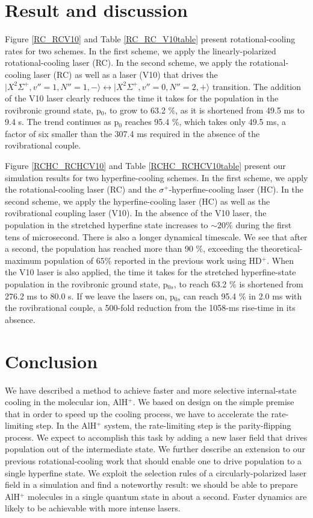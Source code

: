 \documentclass[nofootinbib,aip,jcp,reprint]{revtex4-1}
\begin{document}
\section{Result and discussion}
Figure \ref{RC_RCV10} and Table \ref{RC_RC_V10table} present rotational-cooling rates for two schemes. In the first scheme, we apply the linearly-polarized rotational-cooling laser (RC). In the second scheme, we apply the rotational-cooling laser (RC) as well as a laser (V10) that drives the $\lvert X^2\Sigma^+, v''=1, N''=1, -\rangle \leftrightarrow \lvert X^2\Sigma^+, v''=0, N''=2, +\rangle$ transition. The addition of the V10 laser clearly reduces the time it takes for the population in the rovibronic ground state, p$_0$, to grow to 63.2 $\%$, as it is shortened from 49.5 ms to 9.4 {\micro}s. The trend continues as p$_0$ reaches 95.4 $\%$, which takes only 49.5 ms, a factor of six smaller than the 307.4 ms required in the absence of the rovibrational couple.

Figure \ref{RCHC_RCHCV10} and Table \ref{RCHC_RCHCV10table} present our simulation results for two hyperfine-cooling schemes. In the first scheme, we apply the rotational-cooling laser (RC) and the $\sigma^+$-hyperfine-cooling laser (HC). In the second scheme, we apply the hyperfine-cooling laser (HC) as well as the rovibrational coupling laser (V10). In the absence of the V10 laser, the population in the stretched hyperfine state increases to $\sim 20 \%$ during the first tens of microsecond. There is also a longer dynamical timescale. We see that after a second, the population has reached more than 90 $\%$, exceeding the theoretical-maximum population of $65 \%$ reported in the previous work using HD$^+$\cite{bressel2012manipulation}. When the V10 laser is also applied, the time it takes for the stretched hyperfine-state population in the rovibronic ground state, p$_{0s}$, to reach 63.2 $\%$ is shortened from 276.2 ms to 80.0 {\micro}s. If we leave the lasers on, p$_{0s}$ can reach 95.4 $\%$ in 2.0 ms with the rovibrational couple, a 500-fold reduction from the 1058-ms rise-time in its absence.

\section{Conclusion}
We have described a method to achieve faster and more selective internal-state cooling in the molecular ion, AlH$^+$. We based on design on the simple premise that in order to speed up the cooling process, we have to accelerate the rate-limiting step. In the AlH$^+$ system, the rate-limiting step is the parity-flipping process. We expect to accomplish this task by adding a new laser field that drives population out of the intermediate state. We further describe an extension to our previous rotational-cooling work that should enable one to drive population to a single hyperfine state. We exploit the selection rules of a circularly-polarized laser field in a simulation and find a noteworthy result: we should be able to prepare AlH$^+$ molecules in a single quantum state in about a second. Faster dynamics are likely to be achievable with more intense lasers.



\end{document}
